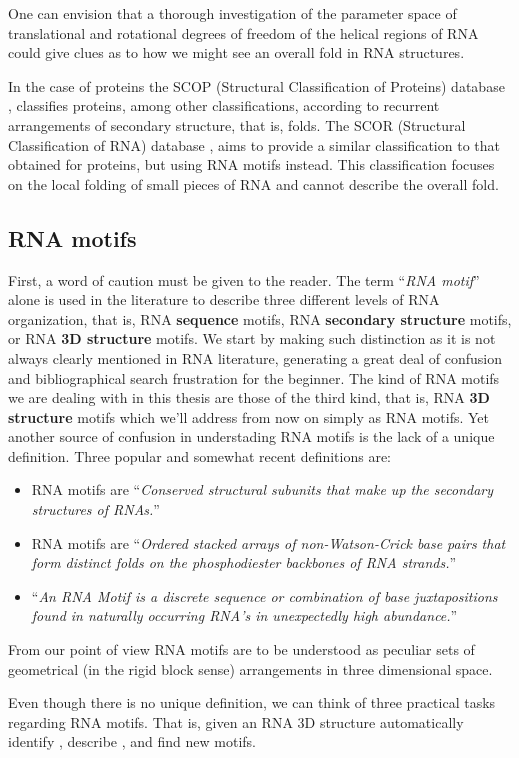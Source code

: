 One can envision that a  thorough investigation of the parameter space
of  translational and  rotational degrees  of freedom  of  the helical
regions of RNA could give clues as to how we might see an overall fold
in RNA structures.

In  the  case  of  proteins  the SCOP  (Structural  Classification  of
Proteins)  database  \cite{andreeva2004},  classifies proteins,  among
other   classifications,  according   to  recurrent   arrangements  of
secondary   structure,   that  is,   folds.    The  SCOR   (Structural
Classification of RNA) database \cite{klosterman2002, klosterman2004},
aims  to  provide  a  similar  classification  to  that  obtained  for
proteins, but using RNA motifs instead. This classification focuses on
the  local folding  of small  pieces of  RNA and  cannot  describe the
overall fold.

\subsection{RNA motifs}
First,  a word  of  caution must  be  given to  the  reader. The  term
``\textit{RNA  motif}'' alone is  used in  the literature  to describe
three   different   levels  of   RNA   organization,   that  is,   RNA
\textbf{sequence} motifs, RNA  \textbf{secondary structure} motifs, or
RNA \textbf{3D structure} motifs.  We start by making such distinction
as it is not always  clearly mentioned in RNA literature, generating a
great deal of confusion and bibliographical search frustration for the
beginner. The  kind of RNA  motifs we  are dealing with  in this
thesis are those of the third kind, that is, RNA \textbf{3D structure}
motifs  which we'll  address from  now on  simply as  RNA  motifs. Yet
another source of confusion in  understading RNA motifs is the lack of
a  unique definition. Three popular and  somewhat
recent definitions are:
\begin{itemize}
\item{RNA motifs are ``\textit{Conserved structural subunits that make
    up the secondary structures of RNAs.}''\cite{holbrook2005}}
\item{RNA   motifs    are   ``\textit{Ordered   stacked    arrays   of
    non-Watson-Crick  base  pairs  that  form distinct  folds  on  the
    phosphodiester backbones of RNA strands.}''\cite{leontis2003}}
\item{``\textit{An RNA Motif is  a discrete sequence or combination of
    base  juxtapositions   found  in  naturally   occurring  RNA's  in
    unexpectedly high abundance.}''\cite{moore1999}}
\end{itemize}
From our point of view RNA motifs are to be understood as  peculiar
sets of geometrical  (in the rigid block sense)  arrangements in three
dimensional space.

Even  though there  is no  unique definition,  we can  think  of three
practical  tasks regarding  RNA  motifs.   That is,  given  an RNA  3D
structure  automatically   identify  \cite{nasalean2009,  lemieux2006,
  duarte2003},  describe  \cite{laing2009,  laing2009a,  holbrook2008,
  spackova2006,   reblova2003},   and   find   new   \cite{sarver2008,
  mokdad2008, duarte2003, stonge2007, lemieux2006} motifs.


